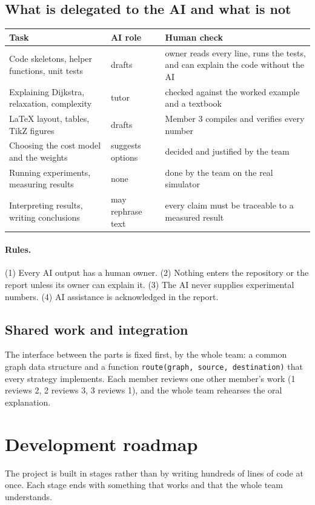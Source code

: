 \documentclass[11pt,a4paper]{article}
\begin{document}
\subsection{What is delegated to the AI and what is not}
\begin{center}
\begin{tabularx}{\textwidth}{LLL}
\toprule
Task & AI role & Human check \\
\midrule
Code skeletons, helper functions, unit tests & drafts & owner reads every line, runs the tests, and
can explain the code without the AI \\
Explaining Dijkstra, relaxation, complexity & tutor & checked against the worked example and a
textbook \\
\LaTeX{} layout, tables, TikZ figures & drafts & Member 3 compiles and verifies every number \\
Choosing the cost model and the weights & suggests options & decided and justified by the team \\
Running experiments, measuring results & none & done by the team on the real simulator \\
Interpreting results, writing conclusions & may rephrase text & every claim must be traceable to a
measured result \\
\bottomrule
\end{tabularx}
\end{center}

\paragraph{Rules.}
(1) Every AI output has a human owner. (2) Nothing enters the repository or the report unless its
owner can explain it. (3) The AI never supplies experimental numbers. (4) AI assistance is
acknowledged in the report.

\subsection{Shared work and integration}
The interface between the parts is fixed first, by the whole team: a common graph data structure and
a function \texttt{route(graph, source, destination)} that every strategy implements. Each member
reviews one other member's work (1 reviews 2, 2 reviews 3, 3 reviews 1), and the whole team rehearses
the oral explanation.

\section{Development roadmap}
The project is built in stages rather than by writing hundreds of lines of code at once. Each stage
ends with something that works and that the whole team understands.
\end{document}
